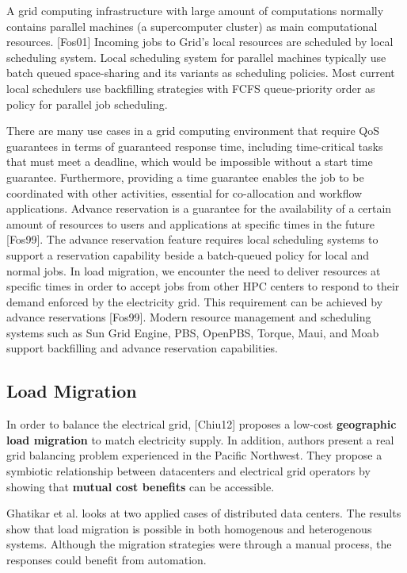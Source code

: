 A grid computing infrastructure with large amount of computations normally
contains parallel machines (a supercomputer cluster) as main computational
resources.  \cite{foster_anatomy_2001} [Fos01]
Incoming jobs to Grid's local resources are scheduled by
local scheduling system. Local scheduling system for parallel machines
typically use batch queued space-sharing and its variants as scheduling
policies. Most current local schedulers use backfilling strategies with FCFS
queue-priority order as policy for parallel job scheduling.

There are many use cases in a grid computing environment that require QoS
guarantees in terms of guaranteed response time, including time-critical
tasks that must meet a deadline, which would be impossible without a start
time guarantee. Furthermore, providing a time guarantee enables the job to be
coordinated with other activities, essential for co-allocation and workflow
applications. Advance reservation is a guarantee for the availability of a
certain amount of resources to users and applications at specific times in
the future 
\cite{foster_distributed_1999} [Fos99]. The advance reservation feature requires local scheduling
systems to support a reservation capability beside a batch-queued policy for
local and normal jobs. In load migration, we encounter the need to deliver
resources at specific times in order to accept jobs from other HPC centers
to respond to their demand enforced by the electricity grid. This requirement
can be achieved by advance reservations 
\cite{foster_distributed_1999}
[Fos99]. Modern resource management
and scheduling systems such as Sun Grid Engine, PBS, OpenPBS, Torque, Maui,
and Moab support backfilling and advance reservation capabilities.

\subsection{Load Migration}

In order to balance the electrical grid,
\cite{chiu_electric_2012}
[Chiu12] proposes a low-cost
\textbf{geographic load migration} to match electricity supply. In addition,
authors present a real grid balancing problem experienced in the Pacific
Northwest. They propose a symbiotic relationship between datacenters and
electrical grid operators by showing that \textbf{mutual cost benefits }can
be accessible.

Ghatikar et al. \cite{Ghatikar2012b} looks at two applied cases of distributed data centers.
 The results show that load migration is possible in both homogenous and heterogenous systems. 
 Although the migration strategies were through a manual process, the responses could benefit from automation.

